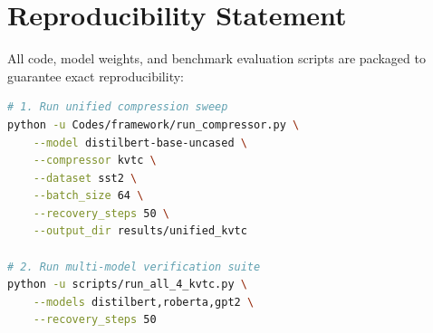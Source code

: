 \section{Reproducibility Statement}
All code, model weights, and benchmark evaluation scripts are packaged to guarantee exact reproducibility:
\begin{lstlisting}[language=bash]
# 1. Run unified compression sweep
python -u Codes/framework/run_compressor.py \
    --model distilbert-base-uncased \
    --compressor kvtc \
    --dataset sst2 \
    --batch_size 64 \
    --recovery_steps 50 \
    --output_dir results/unified_kvtc

# 2. Run multi-model verification suite
python -u scripts/run_all_4_kvtc.py \
    --models distilbert,roberta,gpt2 \
    --recovery_steps 50
\end{lstlisting}
